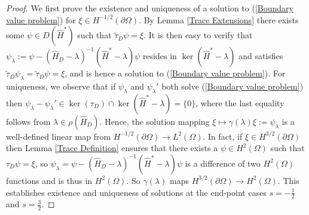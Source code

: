 \documentclass{article}
\numberwithin{equation}{section}
\begin{document}
\begin{proof}
 We first prove the existence and uniqueness of a solution to (\ref{Boundary value problem}) for $\xi \in H^{-1/2}(\partial \Omega)$. By Lemma \ref{Trace Extensions} there exists some $\psi \in D(\hat{H}^*)$ such that $\tilde{\tau}_D\psi=\xi$. It is then easy to verify that $\psi_\lambda:=\psi-(\hat{H}_D-\lambda)^{-1}(\hat{H}^*-\lambda)\psi$ resides in $\ker(\hat{H}^*-\lambda)$ and satisfies $\tilde{\tau}_D\psi_\lambda=\tilde{\tau}_D\psi=\xi$, and is hence a solution to (\ref{Boundary value problem}). For uniqueness, we observe that if $\psi_\lambda$ and $\psi_\lambda'$ both solve (\ref{Boundary value problem}) then $\psi_\lambda-\psi_\lambda'\in \ker(\tau_D)\cap \ker(\hat{H}^*-\lambda)=\{0\}$, where the last equality follows from $\lambda \in \rho(\hat{H}_D)$. Hence, the solution mapping $\xi \mapsto \gamma(\lambda)\xi:=\psi_\lambda$ is a well-defined linear map from $H^{-1/2}(\partial \Omega)\to L^2(\Omega)$. In fact, if $\xi \in H^{3/2}(\partial \Omega)$ then Lemma \ref{Trace Definition} ensures that there exists a $\psi \in H^2(\Omega)$ such that $\tau_D\psi=\xi$, so $\psi_\lambda=\psi - (\hat{H}_D-\lambda)^{-1}(\hat{H}^* - \lambda)\psi$ is a difference of two $H^2(\Omega)$ functions and is thus in $H^2(\Omega)$. So $\gamma(\lambda)$ maps $H^{3/2}(\partial \Omega)\to H^2(\Omega)$. This establishes existence and uniqueness of solutions at the end-point cases $s=-\frac{1}{2}$ and $s=\frac{3}{2}$.
        

\end{proof}
\end{document}
